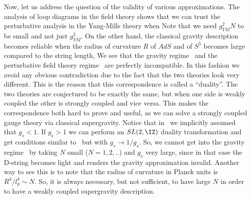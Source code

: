 Now, let us address the question of
the validity of various approximations. The analysis of loop diagrams
in the field theory shows that
we can trust the perturbative analysis in the Yang-Mills theory when
Note that we need $g_{YM}^2 N$ to be small and not just $g_{YM}^2$.
On the other hand, the classical gravity description becomes reliable when
the radius of curvature $R$ of $AdS$ and of $S^5$ becomes large compared
to the string length,
We see that the gravity regime \gravity\ and the perturbative 
field theory regime \pert\ are perfectly incompatible. In this fashion
we avoid any obvious contradiction due to  the fact that
the two theories look very different. This is the reason that 
this correspondence is called a ``duality''. The two theories are
conjectured to be exactly the same, but when one side is weakly coupled
the other is strongly coupled and vice versa. This makes the correspondence
both hard to prove and useful,
as we can solve a strongly coupled gauge theory via classical supergravity.
Notice that in \pert \gravity\ we implicitly assumed that 
$g_s <1$. If $g_s > 1$ we can perform an $SL(2,\IZ)$ duality transformation
and get conditions similar to \pert \gravity\ 
but with $g_s \to 1/g_s$. So, we cannot get into the gravity regime
\gravity\ by taking $N$ small  ($N=1,2,..$)
 and $g_s$ very large, since in that case
the D-string becomes light and renders the gravity approximation 
invalid. Another way to see this is to note that the radius of
curvature in Planck units is $R^4/l_p^4 \sim N$.
So, it is always necessary, but not sufficient, to have
large $N$ in order to have a weakly coupled supergravity description. 

